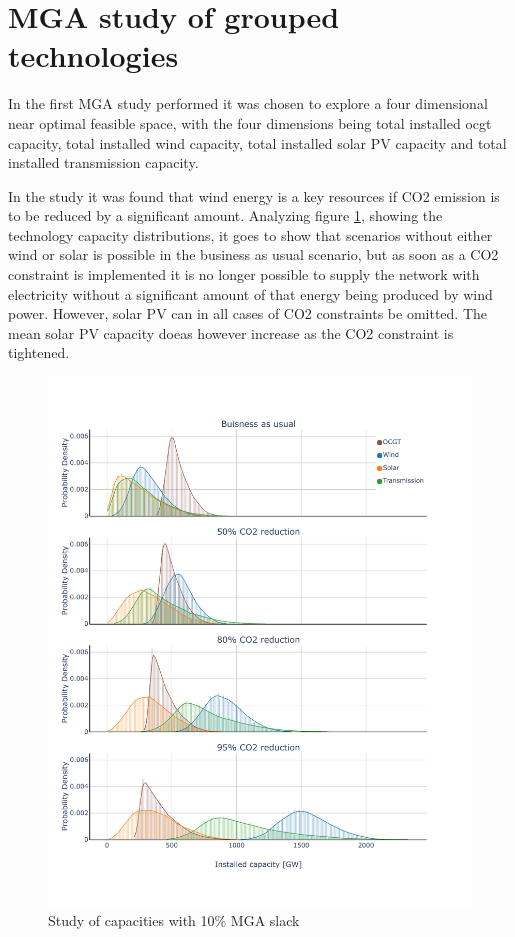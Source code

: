 


\section{MGA study of grouped technologies}

In the first MGA study performed it was chosen to explore a four dimensional near optimal feasible space, with the four dimensions being total installed ocgt capacity, total installed wind capacity, total installed solar PV capacity and total installed transmission capacity. 

In the study it was found that wind energy is a key resources if CO2 emission is to be reduced by a significant amount. Analyzing figure \ref{fig:4d_hist}, showing the technology capacity distributions, it goes to show that scenarios without either wind or solar is possible in the business as usual scenario, but as soon as a CO2 constraint is implemented it is no longer possible to supply the network with electricity without a significant amount of that energy being produced by wind power. However, solar PV can in all cases of CO2 constraints be omitted. The mean solar PV capacity doeas however increase as the CO2 constraint is tightened. 

\begin{figure}[H]\centering
	\includegraphics[width=1.\textwidth]{./Images/4D_study_histogram}
	\caption{Study of capacities with 10\% MGA slack}
	\label{fig:4d_hist}
\end{figure}

